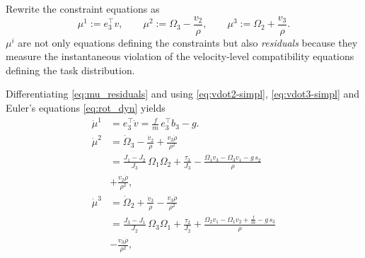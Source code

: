 \documentclass[letterpaper, 10 pt, conference]{ieeeconf}
\begin{document}
Rewrite the constraint equations as
\begin{equation}
\mu^1 := e_3^\top v,
\qquad
\mu^2 := \Omega_3 - \frac{v_2}{\rho},
\qquad
\mu^3 := \Omega_2 + \frac{v_3}{\rho}.
\label{eq:mu_residuals}
\end{equation}
$\mu^i$ are not only equations defining the constraints but also \textit{residuals} because they measure the instantaneous violation of the velocity-level compatibility equations defining the task distribution.






Differentiating \eqref{eq:mu_residuals} and using \eqref{eq:vdot2-simpl}, \eqref{eq:vdot3-simpl} and Euler's equations \eqref{eq:rot_dyn} yields
\begin{align}
\dot \mu^1
&= e_3^\top \dot v
= \frac{f}{m}\,e_3^\top b_3 - g .
\label{eq:mu3dot}
\\[0.5em]
\dot \mu^2
&= \dot \Omega_3 - \frac{\dot v_2}{\rho} + \frac{v_2\dot \rho}{\rho^2} \nonumber\\
&= \frac{J_1-J_2}{J_3}\,\Omega_1\Omega_2 + \frac{\tau_3}{J_3}
- \frac{\Omega_1 v_3 - \Omega_3 v_1 - g\,s_2}{\rho}\nonumber
\\&+ \frac{v_2\dot \rho}{\rho^2},
\label{eq:mu1dot}
\\[0.5em]
\dot \mu^3
&= \dot \Omega_2 + \frac{\dot v_3}{\rho} - \frac{v_3\dot \rho}{\rho^2} \nonumber\\
&= \frac{J_3-J_1}{J_2}\,\Omega_3\Omega_1 + \frac{\tau_2}{J_2}
+ \frac{\Omega_2 v_1 - \Omega_1 v_2 + \frac{f}{m} - g\,s_3}{\rho}\nonumber
\\&- \frac{v_3\dot \rho}{\rho^2},
\label{eq:mu2dot}
\end{align}
\end{document}
